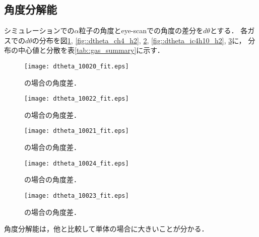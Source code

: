 \documentclass[../master]{subfiles}
\begin{document}
\subsection{角度分解能}
シミュレーションでの$\alpha$粒子の角度とeye-scanでの角度の差分を$d\theta$とする．
各ガスでの$d\theta$の分布を図\ref{fig::dtheta_ch4}, \ref{fig::dtheta_ch4_h2}, \ref{fig::dtheta_ch4_he},
\ref{fig::dtheta_ic4h10_h2}, \ref{fig::dtheta_ic4h10_he}に，
分布の中心値と分散を表\ref{tab::gas_summary}に示す．
\begin{figure}
  \centering
  \begin{minipage}{0.45\columnwidth}
    \centering
    \texttt{[image: dtheta\_10020\_fit.eps]}
    \caption{\Methane の場合の角度差．}
    \label{fig::dtheta_ch4}
  \end{minipage}  
\end{figure}
\begin{figure}
  \centering
  \begin{minipage}{0.45\columnwidth}
    \centering
    \texttt{[image: dtheta\_10022\_fit.eps]}
    \caption{\MethaneHydro の場合の角度差．}
    \label{fig::dtheta_ch4_h2}
  \end{minipage}
  \begin{minipage}{0.45\columnwidth}
    \centering
    \texttt{[image: dtheta\_10021\_fit.eps]}
    \caption{\MethaneHerium の場合の角度差．}
    \label{fig::dtheta_ch4_he}
  \end{minipage}
\end{figure}
\begin{figure}
  \centering
  \begin{minipage}{0.45\columnwidth}
    \centering
    \texttt{[image: dtheta\_10024\_fit.eps]}
    \caption{\isoButaneHydro の場合の角度差．}
    \label{fig::dtheta_ic4h10_h2}
  \end{minipage}
  \begin{minipage}{0.45\columnwidth}
    \centering
    \texttt{[image: dtheta\_10023\_fit.eps]}
    \caption{\isoButaneHerium の場合の角度差．}
    \label{fig::dtheta_ic4h10_he}
  \end{minipage}
\end{figure}
角度分解能は，他と比較して\Methane 単体の場合に大きいことが分かる．
\end{document}
